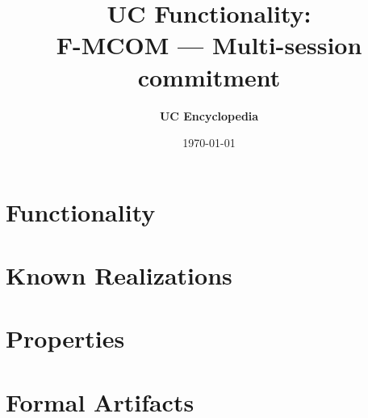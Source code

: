 \documentclass[11pt,a4paper]{article}
\title{\textbf{\Large UC Functionality:}\\[0.2em] \Large F-MCOM --- Multi-session commitment}
\author{\textbf{UC Encyclopedia}}
\date{\today}
\newtheorem{functionality}{Functionality}
\begin{document}
\maketitle

\begin{abstract}
\end{abstract}

\section{Functionality}

%

\section{Known Realizations}


\section{Properties}


\section{Formal Artifacts}

\end{document}
